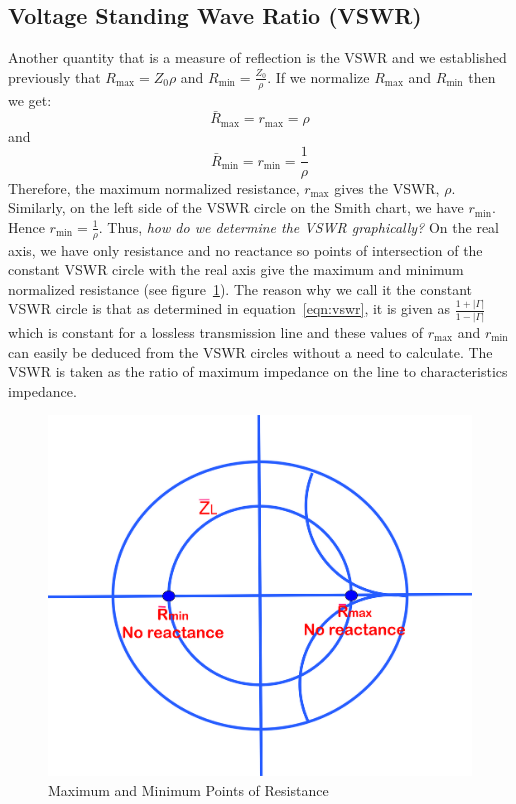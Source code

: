 \subsection{Voltage Standing Wave Ratio (VSWR)}
Another quantity that is a measure of reflection is the VSWR and we established previously that $R_\max = Z_0\rho$ and $R_\min = \frac{Z_0}{\rho}$. If we normalize $R_\max$ and $R_\min$ then we get:
\begin{equation}
\bar{R}_\max = r_\max = {\rho}
\end{equation}
and
\begin{equation}
\bar{R}_\min = r_\min = \frac{1}{\rho}
\end{equation}
Therefore, the maximum normalized resistance, $r_\max$ gives the VSWR, $\rho$. Similarly, on the left side of the VSWR circle on the Smith chart, we have $r_\min$. Hence $r_\min = \frac{1}{\rho}$. Thus, \emph{how do we determine the VSWR graphically?} On the real axis, we have only resistance and no reactance so points of intersection of the constant VSWR circle with the real axis give the maximum and minimum normalized resistance (see figure~\ref{fig:oijhgfdsa}). The reason why we call it the constant VSWR circle is that as determined in equation~\eqref{eqn:vswr}, it is given as $\frac{1 + |\Gamma|}{1 - |\Gamma|}$ which is constant for a lossless transmission line and these values of $r_\max$ and $r_\min$ can easily be deduced from the VSWR circles without a need to calculate. The VSWR is taken as the ratio of maximum impedance on the line to characteristics impedance.
\begin{figure}[h]
\centering
\includegraphics[width=0.7\linewidth]{./graphics/oijhgfdsa}
\caption{Maximum and Minimum Points of Resistance}
\label{fig:oijhgfdsa}
\end{figure}

